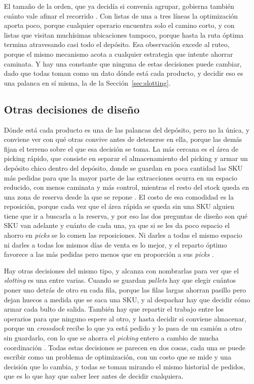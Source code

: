 El tamaño de la orden, que ya decidía si convenía agrupar, gobierna también cuánto vale afinar el recorrido \citep[sección~10.3]{bartholdi2014warehouse}.
Con listas de una a tres líneas la optimización aporta poco, porque cualquier operario encuentra solo el camino corto, y con listas que visitan muchísimas ubicaciones tampoco, porque hasta la ruta óptima termina atravesando casi todo el depósito.
Esa observación excede al ruteo, porque el mismo mecanismo acota a cualquier estrategia que intente ahorrar caminata.
Y hay una constante que ninguna de estas decisiones puede cambiar, dado que todas toman como un dato dónde está cada producto, y decidir eso es una palanca en sí misma, la de la Sección~\ref{sec:slotting}.

\subsection{Otras decisiones de diseño}
\label{sec:otras}

Dónde está cada producto es una de las palancas del depósito, pero no la única, y conviene ver con qué otras convive antes de detenerse en ella, porque las demás fijan el terreno sobre el que esa decisión se toma.
La más cercana es el área de picking rápido, que consiste en separar el almacenamiento del picking y armar un depósito chico dentro del depósito, donde se guardan en poca cantidad las SKU más pedidas para que la mayor parte de las extracciones ocurra en un espacio reducido, con menos caminata y más control, mientras el resto del stock queda en una zona de reserva desde la que se repone \citep[capítulo~8]{bartholdi2014warehouse}.
El costo de esa comodidad es la reposición, porque cada vez que el área rápida se queda sin una SKU alguien tiene que ir a buscarla a la reserva, y por eso las dos preguntas de diseño son qué SKU van adelante y cuánto de cada una, ya que si se les da poco espacio el ahorro en \emph{picks} se lo comen las reposiciones.
Ni darles a todas el mismo espacio ni darles a todas los mismos días de venta es lo mejor, y el reparto óptimo favorece a las más pedidas pero menos que en proporción a sus \emph{picks} \citep[sección~8.3]{bartholdi2014warehouse}.

Hay otras decisiones del mismo tipo, y alcanza con nombrarlas para ver que el \emph{slotting} es una entre varias.
Cuando se guardan \emph{pallets} hay que elegir cuántos poner uno detrás de otro en cada fila, porque las filas largas ahorran pasillo pero dejan huecos a medida que se saca una SKU, y al despachar hay que decidir cómo armar cada bulto de salida.
También hay que repartir el trabajo entre los operarios para que ninguno espere al otro, y hasta decidir si conviene almacenar, porque un \emph{crossdock} recibe lo que ya está pedido y lo pasa de un camión a otro sin guardarlo, con lo que se ahorra el \emph{picking} entero a cambio de mucha coordinación \citep[capítulos~6, 9, 11 y 13]{bartholdi2014warehouse}.
Todas estas decisiones se parecen en dos cosas, cada una se puede escribir como un problema de optimización, con un costo que se mide y una decisión que lo cambia, y todas se toman mirando el mismo historial de pedidos, que es lo que hay que saber leer antes de decidir cualquiera.

